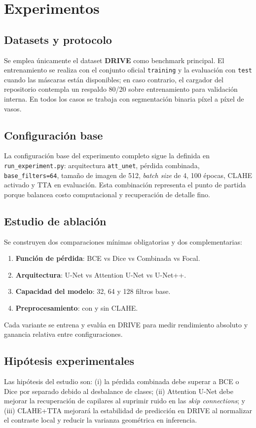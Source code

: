 \section{Experimentos}
\subsection{Datasets y protocolo}
Se emplea únicamente el dataset \textbf{DRIVE} como benchmark principal. El entrenamiento se realiza con el conjunto oficial \texttt{training} y la evaluación con \texttt{test} cuando las máscaras están disponibles; en caso contrario, el cargador del repositorio contempla un respaldo 80/20 sobre entrenamiento para validación interna. En todos los casos se trabaja con segmentación binaria píxel a píxel de vasos.

\subsection{Configuración base}
La configuración base del experimento completo sigue la definida en \texttt{run\_experiment.py}: arquitectura \texttt{att\_unet}, pérdida combinada, \texttt{base\_filters=64}, tamaño de imagen de 512, \emph{batch size} de 4, 100 épocas, CLAHE activado y TTA en evaluación. Esta combinación representa el punto de partida porque balancea costo computacional y recuperación de detalle fino.

\subsection{Estudio de ablación}
Se construyen dos comparaciones mínimas obligatorias y dos complementarias:
\begin{enumerate}
    \item \textbf{Función de pérdida}: BCE vs Dice vs Combinada vs Focal.
    \item \textbf{Arquitectura}: U-Net vs Attention U-Net vs U-Net++.
    \item \textbf{Capacidad del modelo}: 32, 64 y 128 filtros base.
    \item \textbf{Preprocesamiento}: con y sin CLAHE.
\end{enumerate}
Cada variante se entrena y evalúa en DRIVE para medir rendimiento absoluto y ganancia relativa entre configuraciones.

\subsection{Hipótesis experimentales}
Las hipótesis del estudio son: (i) la pérdida combinada debe superar a BCE o Dice por separado debido al desbalance de clases; (ii) Attention U-Net debe mejorar la recuperación de capilares al suprimir ruido en las \emph{skip connections}; y (iii) CLAHE+TTA mejorará la estabilidad de predicción en DRIVE al normalizar el contraste local y reducir la varianza geométrica en inferencia.
